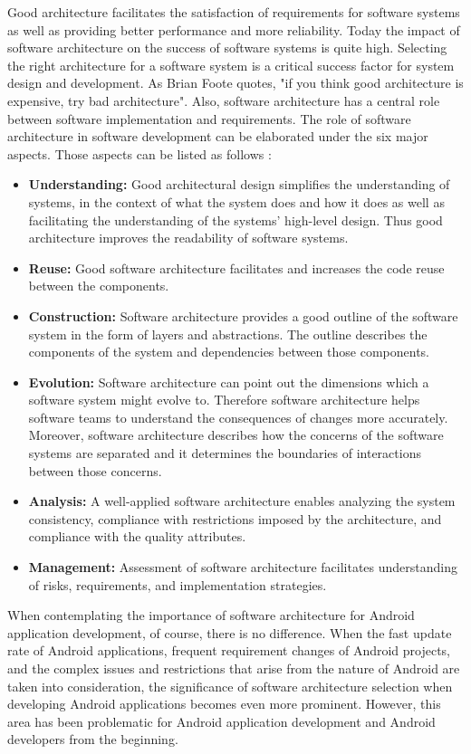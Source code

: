 Good architecture facilitates the satisfaction of requirements for software systems as well as providing better performance and more reliability. Today the impact of software architecture on the success of software systems is quite high. Selecting the right architecture for a software system is a critical success factor for system design and development. As Brian Foote quotes, "if you think good architecture is expensive, try bad architecture"\cite{10}. Also, software architecture has a central role between software implementation and requirements. The role of software architecture in software development can be elaborated under the six major aspects. Those aspects can be listed as follows \cite{25}:
\begin{itemize}
    \item \textbf{Understanding:} Good architectural design simplifies the understanding of systems, in the context of what the system does and how it does as well as facilitating the understanding of the systems’ high-level design. Thus good architecture improves the readability of software systems.
    \item \textbf{Reuse:} Good software architecture facilitates and increases the code reuse between the components.
    \item \textbf{Construction:} Software architecture provides a good outline of the software system in the form of layers and abstractions. The outline describes the components of the system and dependencies between those components.
    \item \textbf{Evolution:} Software architecture can point out the dimensions which a software system might evolve to. Therefore software architecture helps software teams to understand the consequences of changes more accurately. Moreover, software architecture describes how the concerns of the software systems are separated and it determines the boundaries of interactions between those concerns. 
    \item \textbf{Analysis:} A well-applied software architecture enables analyzing the system consistency, compliance with restrictions imposed by the architecture, and compliance with the quality attributes.
    \item \textbf{Management:} Assessment of software architecture facilitates understanding of risks, requirements, and implementation strategies.
\end{itemize}
When contemplating the importance of software architecture for Android application development, of course, there is no difference. When the fast update rate of Android applications, frequent requirement changes of Android projects, and the complex issues and restrictions that arise from the nature of Android are taken into consideration, the significance of software architecture selection when developing Android applications becomes even more prominent. However, this area has been problematic for Android application development and Android developers from the beginning.

